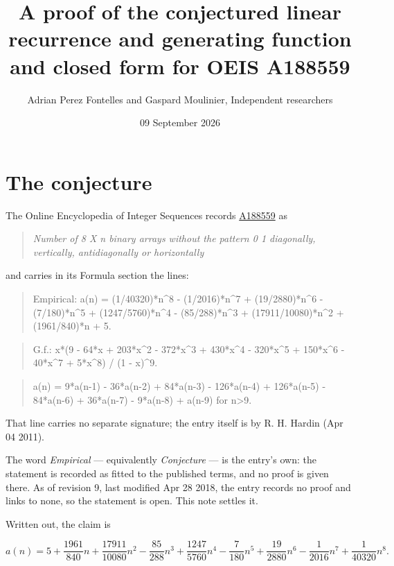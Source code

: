 \documentclass[11pt]{article}
\title{A proof of the conjectured linear recurrence and generating function and closed form for OEIS A188559}
\author{Adrian Perez Fontelles and Gaspard Moulinier, Independent researchers}
\date{09 September 2026}
\theoremstyle{definition}
\begin{document}
\maketitle
\section{The conjecture}

The Online Encyclopedia of Integer Sequences records \href{https://oeis.org/A188559}{A188559} as

\begin{quote}\itshape Number of 8 X n binary arrays without the pattern 0 1 diagonally, vertically, antidiagonally or horizontally\end{quote}

and carries in its Formula section the lines:

\begin{quote}\ttfamily Empirical: a(n) = (1/40320)*n\textasciicircum{}8 - (1/2016)*n\textasciicircum{}7 + (19/2880)*n\textasciicircum{}6 - (7/180)*n\textasciicircum{}5 + (1247/5760)*n\textasciicircum{}4 - (85/288)*n\textasciicircum{}3 + (17911/10080)*n\textasciicircum{}2 + (1961/840)*n + 5.\end{quote}

\begin{quote}\ttfamily G.f.: x*(9 - 64*x + 203*x\textasciicircum{}2 - 372*x\textasciicircum{}3 + 430*x\textasciicircum{}4 - 320*x\textasciicircum{}5 + 150*x\textasciicircum{}6 - 40*x\textasciicircum{}7 + 5*x\textasciicircum{}8) / (1 - x)\textasciicircum{}9.\end{quote}

\begin{quote}\ttfamily a(n) = 9*a(n-1) - 36*a(n-2) + 84*a(n-3) - 126*a(n-4) + 126*a(n-5) - 84*a(n-6) + 36*a(n-7) - 9*a(n-8) + a(n-9) for n>9.\end{quote}

That line carries no separate signature; the entry itself is by R. H. Hardin (Apr 04 2011).

The word {\itshape Empirical} --- equivalently {\itshape Conjecture} --- is the entry's own: the statement is recorded as fitted to the published terms, and no proof is given there. As of revision 9, last modified Apr 28 2018, the entry records no proof and links to none, so the statement is open. This note settles it.

Written out, the claim is

\[a(n) = 5 + \frac{1961}{840}n + \frac{17911}{10080}n^{2} - \frac{85}{288}n^{3} + \frac{1247}{5760}n^{4} - \frac{7}{180}n^{5} + \frac{19}{2880}n^{6} - \frac{1}{2016}n^{7} + \frac{1}{40320}n^{8}.\]
\end{document}
